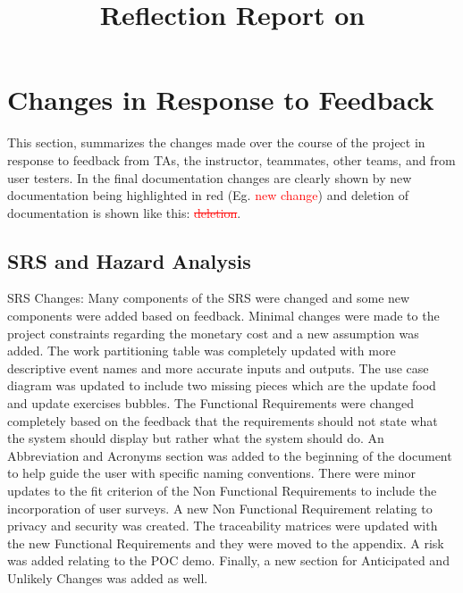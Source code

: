 \documentclass{article}
\title{Reflection Report on \progname}
\author{\authname}
\date{}
\begin{document}
\maketitle


\section{Changes in Response to Feedback}

This section, summarizes the changes made over the course of the project in response to feedback from TAs, the instructor, teammates, other teams, and from user testers. In the final documentation changes are clearly shown by new documentation being highlighted in red (Eg. \textcolor{red}{new change}) and deletion of documentation is shown like this: \textcolor{red}{\sout{deletion}}.

\subsection{SRS and Hazard Analysis}
SRS Changes: Many components of the SRS were changed and some new components were added based on feedback. Minimal changes were made to the project constraints regarding the monetary cost and a new assumption was added. The work partitioning table was completely updated with more descriptive event names and more accurate inputs and outputs. The use case diagram was updated to include two missing pieces which are the update food and update exercises bubbles. The Functional Requirements were changed completely based on the feedback that the requirements should not state what the system should display but rather what the system should do. An Abbreviation and Acronyms section was added to the beginning of the document to help guide the user with specific naming conventions. There were minor updates to the fit criterion of the Non Functional Requirements to include the incorporation of user surveys. A new  Non Functional Requirement relating to privacy and security was created. The traceability matrices were updated with the new Functional Requirements and they were moved to the appendix. A risk was added relating to the POC demo. Finally, a new section for Anticipated and Unlikely Changes was added as well.
\end{document}
